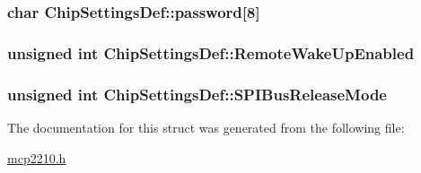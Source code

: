 \hypertarget{struct_chip_settings_def_a0e9e9123c42b18bdd6294d0ae7935582}{
\subsubsection[{password}]{\setlength{\rightskip}{0pt plus 5cm}char {\bf \-Chip\-Settings\-Def\-::password}\mbox{[}8\mbox{]}}}\label{struct_chip_settings_def_a0e9e9123c42b18bdd6294d0ae7935582}
\hypertarget{struct_chip_settings_def_a5a29397e3fd6793de5d8d348b3b11d22}{
\subsubsection[{\-Remote\-Wake\-Up\-Enabled}]{\setlength{\rightskip}{0pt plus 5cm}unsigned int {\bf \-Chip\-Settings\-Def\-::\-Remote\-Wake\-Up\-Enabled}}}\label{struct_chip_settings_def_a5a29397e3fd6793de5d8d348b3b11d22}
\hypertarget{struct_chip_settings_def_abeaf6785170c987a19025a506cf14a8d}{
\subsubsection[{\-S\-P\-I\-Bus\-Release\-Mode}]{\setlength{\rightskip}{0pt plus 5cm}unsigned int {\bf \-Chip\-Settings\-Def\-::\-S\-P\-I\-Bus\-Release\-Mode}}}\label{struct_chip_settings_def_abeaf6785170c987a19025a506cf14a8d}


\-The documentation for this struct was generated from the following file\-:\begin{DoxyCompactItemize}
\item 
\hyperlink{mcp2210_8h}{mcp2210.\-h}\end{DoxyCompactItemize}
